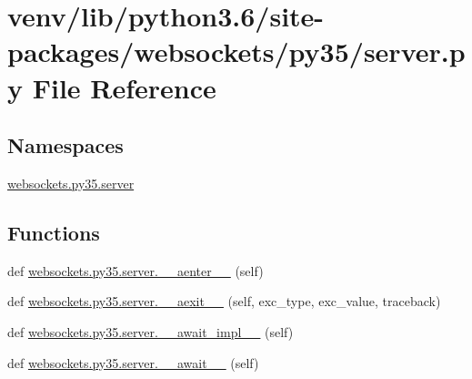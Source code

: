 \hypertarget{venv_2lib_2python3_86_2site-packages_2websockets_2py35_2server_8py}{}\section{venv/lib/python3.6/site-\/packages/websockets/py35/server.py File Reference}
\label{venv_2lib_2python3_86_2site-packages_2websockets_2py35_2server_8py}
\subsection*{Namespaces}
\begin{DoxyCompactItemize}
\item 
 \hyperlink{namespacewebsockets_1_1py35_1_1server}{websockets.\+py35.\+server}
\end{DoxyCompactItemize}
\subsection*{Functions}
\begin{DoxyCompactItemize}
\item 
def \hyperlink{namespacewebsockets_1_1py35_1_1server_af3ec745b50511831ff771a2ccf598ef3}{websockets.\+py35.\+server.\+\_\+\+\_\+aenter\+\_\+\+\_\+} (self)
\item 
def \hyperlink{namespacewebsockets_1_1py35_1_1server_a9474f031cf39ab396ccadc159548f987}{websockets.\+py35.\+server.\+\_\+\+\_\+aexit\+\_\+\+\_\+} (self, exc\+\_\+type, exc\+\_\+value, traceback)
\item 
def \hyperlink{namespacewebsockets_1_1py35_1_1server_a19d06ddfa27bbb3f80eb86d1f171da91}{websockets.\+py35.\+server.\+\_\+\+\_\+await\+\_\+impl\+\_\+\+\_\+} (self)
\item 
def \hyperlink{namespacewebsockets_1_1py35_1_1server_af97a5338c2908f375038dc5d0a507e79}{websockets.\+py35.\+server.\+\_\+\+\_\+await\+\_\+\+\_\+} (self)
\end{DoxyCompactItemize}
